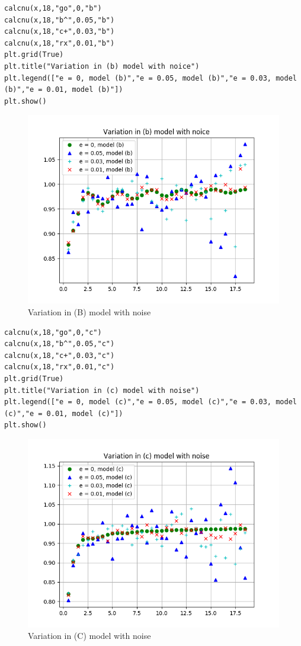 \documentclass[a4paper]{article}
\begin{document}
\begin{lstlisting}
calcnu(x,18,"go",0,"b")
calcnu(x,18,"b^",0.05,"b")
calcnu(x,18,"c+",0.03,"b")
calcnu(x,18,"rx",0.01,"b")
plt.grid(True)
plt.title("Variation in (b) model with noice")
plt.legend(["e = 0, model (b)","e = 0.05, model (b)","e = 0.03, model (b)","e = 0.01, model (b)"])
plt.show()

\end{lstlisting}
\begin{figure}
\includegraphics[width=\columnwidth]{Figure_1-5.png}
\caption{Variation in (B) model with noise}
\end{figure}

\begin{lstlisting}
calcnu(x,18,"go",0,"c")
calcnu(x,18,"b^",0.05,"c")
calcnu(x,18,"c+",0.03,"c")
calcnu(x,18,"rx",0.01,"c")
plt.grid(True)
plt.title("Variation in (c) model with noise")
plt.legend(["e = 0, model (c)","e = 0.05, model (c)","e = 0.03, model (c)","e = 0.01, model (c)"])
plt.show()
\end{lstlisting}

\begin{figure}
\includegraphics[width=\columnwidth]{Figure_1-6.png}
\caption{Variation in (C) model with noise}
\end{figure}
\end{document}
